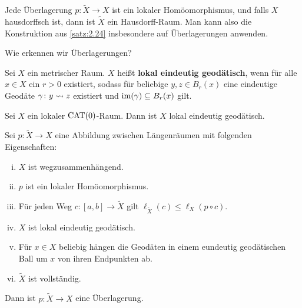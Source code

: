 \begin{bemerkung}
\label{bem:2.25}
	Jede Überlagerung $p\colon \tilde{X} \rightarrow X$ ist ein lokaler Homöomorphismus, und falls $X$ hausdorffsch ist, dann ist $\tilde{X}$ ein Hausdorff-Raum.
	Man kann also die Konstruktion aus \autoref{satz:2.24} insbesondere auf Überlagerungen anwenden.
\end{bemerkung}

Wie erkennen wir Überlagerungen?

\begin{definition}
\label{def:2.26}
	Sei $X$ ein metrischer Raum.
	$X$ heißt \textbf{lokal eindeutig geodätisch}, wenn für alle $x \in X$ ein $r > 0$ existiert, sodass für beliebige $y,z \in B_r(x)$ eine eindeutige Geodäte $\gamma \colon y \rightsquigarrow z$ existiert und $\operatorname{im}(\gamma) \subseteq B_r(x)$ gilt. 
\end{definition}

\begin{beispiel}
\label{bsp:2.27}
	Sei $X$ ein lokaler $\operatorname{CAT(0)}$-Raum.
	Dann ist $X$ lokal eindeutig geodätisch.
\end{beispiel}
\newpage
\begin{satz}
\label{satz:2.28}
	Sei $p\colon \tilde{X} \rightarrow X$ eine Abbildung zwischen Längenräumen mit folgenden Eigenschaften:
	\begin{enumerate}[(i)]
		\item $X$ ist wegzusammenhängend.
		\item $p$ ist ein lokaler Homöomorphismus.
		\item Für jeden Weg $c \colon [a,b] \rightarrow \tilde{X}$ gilt $\ell_{\tilde{X}}(c) \leq \ell_X (p \circ c)$.
		\item $X$ ist lokal eindeutig geodätisch.
		\item Für $x \in X$ beliebig hängen die Geodäten in einem eundeutig geodätischen Ball um $x$ von ihren Endpunkten ab.
		\item $\tilde{X}$ ist vollständig.
	\end{enumerate}
	Dann ist $p \colon \tilde{X} \rightarrow X$ eine Überlagerung.
\end{satz}

